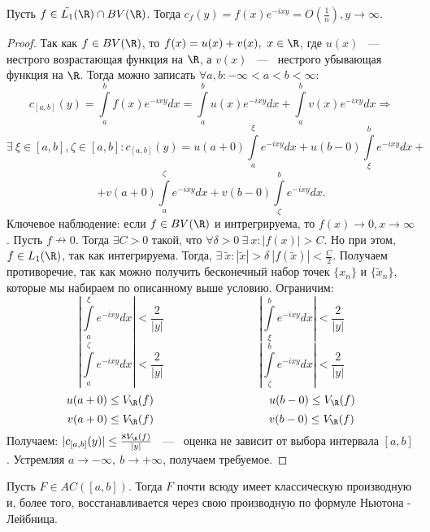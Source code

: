 \begin{lemma}[Основная]
    Пусть $f \in \tilde{L_1}(\R) \cap BV(\R)$. Тогда $c_f(y) = f(x) e^{-ixy} = O(\frac{1}{n}), y \rightarrow \infty$.
\end{lemma}
\begin{proof}
    Так как $f \in BV(\R)$, то $f(x) = u(x) + v(x), \ x \in \R$, где $u(x)$ ~---~ нестрого возрастающая функция на $\R$, а $v(x)$ ~---~ нестрого убывающая функция на $\R$. \newline
    Тогда можно записать $\forall a, b : -\infty < a < b < \infty$:
    $$
    c_{[a, b]}(y) = \int\limits_{a}^{b} f(x) e^{-ixy} dx = \int\limits_{a}^{b} u(x) e^{-ixy} dx + \int\limits_{a}^{b} v(x) e^{-ixy} dx \Rightarrow
    $$
    $$
    \exists \ \xi \in [a, b], \zeta \in [a, b] : c_{[a, b]}(y) = u(a + 0) \int\limits_{a}^{\xi} e^{-ixy} dx + u(b - 0)\int\limits_{\xi}^{b} e^{-ixy} dx + 
    $$
    $$
     + v(a + 0) \int\limits_{a}^{\zeta} e^{-ixy} dx + v(b - 0) \int\limits_{\zeta}^{b} e^{-ixy} dx.
    $$
    Ключевое наблюдение: если $f \in BV(\R)$ и интрегрируема, то $f(x) \rightarrow 0, x \rightarrow \infty$. \newline
    Пусть $f \nrightarrow 0$. Тогда $\exists C > 0$ такой, что $\forall \delta > 0 \ \exists \ x : |f(x)| > C$. Но при этом, $f \in L_1(\R)$, так как интегрируема. Тогда, $\exists \ \tilde{x} : |\tilde{x}| > \delta \  |f(\tilde{x})| < \frac{C}{2}$. Получаем противоречие, так как можно получить бесконечный набор точек $\{x_n\}$ и $\{\tilde{x}_n\}$, которые мы набираем по описанному выше условию. \newline
    Ограничим: 
    $$
    \left| \int\limits_{a}^{\xi} e^{-ixy} dx \right| < \frac{2}{|y|} \hspace{100pt} \left| \int\limits_{\xi}^{b} e^{-ixy} dx \right| < \frac{2}{|y|}
    $$
    $$
    \left| \int\limits_{a}^{\zeta} e^{-ixy} dx \right| < \frac{2}{|y|} \hspace{100pt} \left| \int\limits_{\zeta}^{b} e^{-ixy} dx \right| < \frac{2}{|y|}
    $$
    $$
    u(a + 0) \le V_{\R}(f) \hspace{102pt} u(b - 0) \le V_{\R}(f)
    $$
    $$
    v(a + 0) \le V_{\R}(f) \hspace{102pt} v(b - 0) \le V_{\R}(f)
    $$
    Получаем: $|c_{[a, b]}(y)| \le \frac{8 V_{\R}(f)}{|y|}$ ~---~ оценка не зависит от выбора интервала $[a, b]$. Устремляя $a \rightarrow -\infty, \ b \rightarrow +\infty$, получаем требуемое. 
\end{proof}

\begin{theorem}[б/д]
    Пусть $F \in AC([a, b])$. Тогда $F$ почти всюду имеет классическую производную и, более того, восстанавливается через свою производную по формуле Ньютона - Лейбница. 
\end{theorem}

